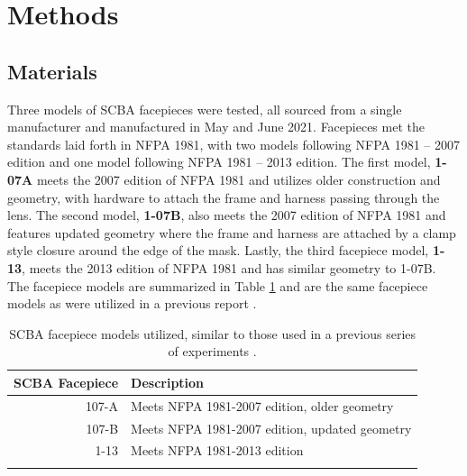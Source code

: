 \documentclass[sn-mathphys]{sn-jnl}%
\theoremstyle{thmstyleone}%
\theoremstyle{thmstyletwo}%
\theoremstyle{thmstylethree}%
\begin{document}
\section{Methods}\label{sec2}
\subsection{Materials}\label{subsec2}
Three models of SCBA facepieces were tested, all sourced from a single manufacturer and manufactured in May and June 2021. Facepieces met the standards laid forth in NFPA 1981, with two models following NFPA 1981 – 2007 edition and one model following NFPA 1981 – 2013 edition. The first model, \textbf{1-07A} meets the 2007 edition of NFPA 1981 and utilizes older construction and geometry, with hardware to attach the frame and harness passing through the lens. The second model, \textbf{1-07B}, also meets the 2007 edition of NFPA 1981 and features updated geometry where the frame and harness are attached by a clamp style closure around the edge of the mask. Lastly, the third facepiece model, \textbf{1-13}, meets the 2013 edition of NFPA 1981 and has similar geometry to 1-07B. The facepiece models are summarized in Table \ref{tab1} and are the same facepiece models as were utilized in a previous report \cite{kesler_mechanical_2018}. 

\begin{table}[h]
\begin{center}
\caption{SCBA facepiece models utilized, similar to those used in a previous series of experiments \cite{kesler_mechanical_2018}.}\label{tab1}%
\begin{tabular}{rl}
\toprule
SCBA Facepiece & Description  \\
\midrule
107-A    & Meets NFPA 1981-2007 edition, older geometry   \\
107-B    & Meets NFPA 1981-2007 edition, updated geometry     \\
1-13    & Meets NFPA 1981-2013 edition  \\
\botrule
\end{tabular}
\end{center}
\end{table}
\end{document}

